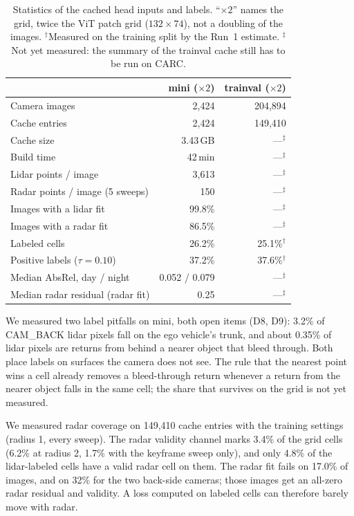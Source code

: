 \begin{table}[t]
  \centering
  \small
  \setlength{\tabcolsep}{2pt}
  \begin{tabular}{@{}l r r@{}}
    \toprule
    & \textbf{mini ($\times 2$)} & \textbf{trainval ($\times 2$)} \\
    \midrule
    Camera images & 2,424 & 204,894 \\
    Cache entries & 2,424 & 149,410 \\
    Cache size & 3.43\,GB & ---$^{\ddagger}$ \\
    Build time & 42\,min & ---$^{\ddagger}$ \\
    Lidar points / image & 3,613 & ---$^{\ddagger}$ \\
    Radar points / image (5 sweeps) & 150 & ---$^{\ddagger}$ \\
    Images with a lidar fit & 99.8\% & ---$^{\ddagger}$ \\
    Images with a radar fit & 86.5\% & ---$^{\ddagger}$ \\
    Labeled cells & 26.2\% & 25.1\%$^{\dagger}$ \\
    Positive labels ($\tau = 0.10$) & 37.2\% & 37.6\%$^{\dagger}$ \\
    Median AbsRel, day / night & 0.052 / 0.079 & ---$^{\ddagger}$ \\
    Median radar residual (radar fit) & 0.25 & ---$^{\ddagger}$ \\
    \bottomrule
  \end{tabular}
  \caption{Statistics of the cached head inputs and labels. ``$\times 2$'' names the grid, twice the ViT patch grid ($132 \times 74$), not a doubling of the images. $^{\dagger}$Measured on the training split by the Run~1 estimate. $^{\ddagger}$Not yet measured: the summary of the trainval cache still has to be run on CARC.}
  \label{tab:cachestats}
\end{table}

We measured two label pitfalls on mini, both open items (D8, D9): 3.2\% of CAM\_BACK lidar pixels fall on the ego vehicle's trunk, and about 0.35\% of lidar pixels are returns from behind a nearer object that bleed through. Both place labels on surfaces the camera does not see. The rule that the nearest point wins a cell already removes a bleed-through return whenever a return from the nearer object falls in the same cell; the share that survives on the grid is not yet measured.

We measured radar coverage on 149,410 cache entries with the training settings (radius 1, every sweep). The radar validity channel marks 3.4\% of the grid cells (6.2\% at radius 2, 1.7\% with the keyframe sweep only), and only 4.8\% of the lidar-labeled cells have a valid radar cell on them. The radar fit fails on 17.0\% of images, and on 32\% for the two back-side cameras; those images get an all-zero radar residual and validity. A loss computed on labeled cells can therefore barely move with radar.

